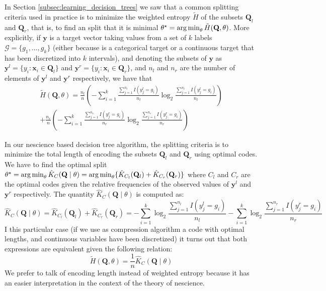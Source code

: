 In Section \ref{subsec:learning_decision_trees} we saw that a common splitting criteria used in practice is to minimize the weighted entropy $\tilde{H}$ of the subsets $\mathbf{Q}_l$ and $\mathbf{Q}_r$, that is, to find an split that it is minimal $\theta^\star = \operatorname*{arg\,min}_\theta \tilde{H}(\mathbf{Q},\theta)$. More explicitly, if $\mathbf{y}$ is a target vector taking values from a set of $k$ labels $\mathcal{G} = \{g_1, \ldots, g_k \}$ (either because is a categorical target or a continuous target that has been discretized into $k$ intervals), and denoting the subsets of $\mathbf{y}$ as $\mathbf{y}^l = \{y_i : \mathbf{x}_i \in \mathbf{Q}_l \}$ and $\mathbf{y}^r = \{y_i : \mathbf{x}_i \in \mathbf{Q}_r \}$, and $n_l$ and $n_r$ are the number of elements of $\mathbf{y}^l$ and $\mathbf{y}^r$ respectively, we have that
\begin{multline}
\tilde{H}(\mathbf{Q},\theta) = \frac{n_l}{n} \left( - \sum_{i=1}^k \frac{ \sum_{j=1}^{n_l} I(y^l_j = g_i)} {n_l} \log_2{ \frac{ \sum_{j=1}^{n_l} I(y^l_j = g_i)} {n_l} } \right) \\
+ \frac{n_r}{n} \left( - \sum_{i=1}^k \frac{ \sum_{j=1}^{n_r} I(y^r_j = g_i)} {n_r} \log_2{ \frac{ \sum_{j=1}^{n_r} I(y^r_j = g_i)} {n_r} } \right)
\end{multline}

In our nescience based decision tree algorithm, the splitting criteria is to minimize the total length of encoding the subsets $\mathbf{Q}_l$ and $\mathbf{Q}_r$ using optimal codes. We have to find the optimal split $ \theta^\star = \operatorname*{arg\,min}_\theta \hat{K}_C(\mathbf{Q} \mid \theta) = \operatorname*{arg\,min}_\theta \{ \hat{K}_{C_l}(\mathbf{Q}_l) + \hat{K}_{C_r}(\mathbf{Q}_r) \}$ where $C_l$ and $C_r$ are the optimal codes given the relative frequencies of the observed values of $\mathbf{y}^l$ and $\mathbf{y}^r$ respectively. The quantity $\hat{K}_C(\mathbf{Q} \mid \theta)$ is computed as:
\[
\hat{K}_C(\mathbf{Q} \mid \theta) = \hat{K}_{C_l}(\mathbf{Q}_l) + \hat{K}_{C_r}(\mathbf{Q}_r) = - \sum_{i=1}^k \log_2{ \frac{ \sum_{j=1}^{n_l} I(y^l_j = g_i)} {n_l} } - \sum_{i=1}^k \log_2{ \frac{ \sum_{j=1}^{n_r} I(y^r_j = g_i)} {n_r} }
\]
I this particular case (if we use as compression algorithm a code with optimal lengths, and continuous variables have been discretized) it turns out that both expressions are equivalent given the following relation:
\[
\tilde{H}(\mathbf{Q},\theta) = \frac{1}{n} \hat{K}_C(\mathbf{Q} \mid \theta)
\]
We prefer to talk of encoding length instead of weighted entropy because it has an easier interpretation in the context of the theory of nescience.

